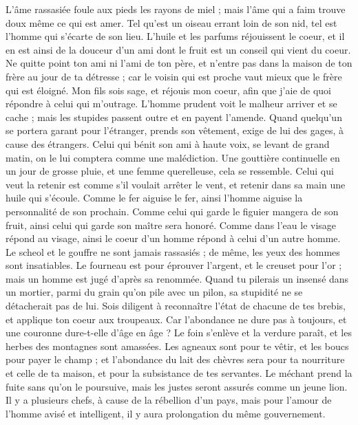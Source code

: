 \begin{multicols}{2}
L'âme rassasiée foule aux pieds les rayons de miel ; mais l'âme qui a faim trouve doux même ce qui est amer.
Tel qu'est un oiseau errant loin de son nid, tel est l'homme qui s'écarte de son lieu.
L'huile et les parfums réjouissent le coeur, et il en est ainsi de la douceur d'un ami dont le fruit est un conseil qui vient du coeur.
Ne quitte point ton ami ni l'ami de ton père, et n'entre pas dans la maison de ton frère au jour de ta détresse ; car le voisin qui est proche vaut mieux que le frère qui est éloigné.
Mon fils sois sage, et réjouis mon coeur, afin que j'aie de quoi répondre à celui qui m'outrage.
L'homme prudent voit le malheur arriver et se cache ; mais les stupides passent outre et en payent l'amende.
Quand quelqu'un se portera garant pour l'étranger, prends son vêtement, exige de lui des gages, à cause des étrangers.
Celui qui bénit son ami à haute voix, se levant de grand matin, on le lui comptera comme une malédiction.
Une gouttière continuelle en un jour de grosse pluie, et une femme querelleuse, cela se ressemble.
Celui qui veut la retenir est comme s'il voulait arrêter le vent, et retenir dans sa main une huile qui s'écoule.
Comme le fer aiguise le fer, ainsi l'homme aiguise la personnalité de son prochain.
Comme celui qui garde le figuier mangera de son fruit, ainsi celui qui garde son maître sera honoré.
Comme dans l'eau le visage répond au visage, ainsi le coeur d'un homme répond à celui d'un autre homme.
Le scheol et le gouffre ne sont jamais rassasiés ; de même, les yeux des hommes sont insatiables.
Le fourneau est pour éprouver l'argent, et le creuset pour l'or ; mais un homme est jugé d'après sa renommée.
Quand tu pilerais un insensé dans un mortier, parmi du grain qu'on pile avec un pilon, sa stupidité ne se détacherait pas de lui.
Sois diligent à reconnaître l'état de chacune de tes brebis, et applique ton coeur aux troupeaux.
Car l'abondance ne dure pas à toujours, et une couronne dure-t-elle d'âge en âge ?
Le foin s'enlève et la verdure paraît, et les herbes des montagnes sont amassées.
Les agneaux sont pour te vêtir, et les boucs pour payer le champ ;
et l'abondance du lait des chèvres sera pour ta nourriture et celle de ta maison, et pour la subsistance de tes servantes.
\VerseOne{}Le méchant prend la fuite sans qu'on le poursuive, mais les justes seront assurés comme un jeune lion.
Il y a plusieurs chefs, à cause de la rébellion d'un pays, mais pour l'amour de l'homme avisé et intelligent, il y aura prolongation du même gouvernement.

\end{multicols}
